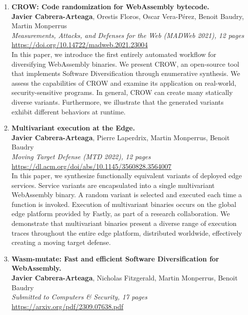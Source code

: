 \begin{enumerate}[label={\textbf{\Roman*}:}, ref={\Roman*}]
	\item \label{crowpaper} \textbf{CROW: Code randomization for WebAssembly bytecode.} \\ 
	\textbf{Javier Cabrera-Arteaga}, Orestis Floros, Oscar Vera-Pérez, Benoit Baudry, Martin Monperrus\\
	\textit{ Measurements, Attacks, and Defenses for the Web (MADWeb 2021), 12 pages} \\
	\url{https://doi.org/10.14722/madweb.2021.23004} \\
	
	 In this paper, we introduce the first entirely automated workflow for diversifying WebAssembly binaries. 
	We present CROW, an open-source tool that implements Software Diversification through enumerative synthesis. 
	We assess the capabilities of CROW and examine its application on real-world, security-sensitive programs.
	In general, CROW can create many statically diverse variants. 
	Furthermore, we illustrate that the generated variants exhibit different behaviors at runtime.

	
	
	\item \label{mewepaper} \textbf{Multivariant execution at the Edge. } \\
	\textbf{Javier Cabrera-Arteaga}, Pierre Laperdrix, Martin Monperrus, Benoit Baudry\\
    \textit{Moving Target Defense (MTD 2022), 12 pages} \\
    \url{https://dl.acm.org/doi/abs/10.1145/3560828.3564007} \\

	In this paper, we synthesize functionally equivalent variants of deployed edge services. 
	Service variants are encapsulated into a single multivariant WebAssembly binary. 
	A random variant is selected and executed each time a function is invoked.
	Execution of multivariant binaries occurs on the global edge platform provided by Fastly, as part of a research collaboration. 
	We demonstrate that multivariant binaries present a diverse range of execution traces throughout the entire edge platform, distributed worldwide, effectively creating a moving target defense.

	
	\item \label{wasmmutatepaper}\textbf{Wasm-mutate: Fast and efficient Software Diversification for WebAssembly. }\\ 
	\textbf{Javier Cabrera-Arteaga}, Nicholas Fitzgerald, Martin Monperrus, Benoit Baudry\\
	\textit{Submitted to Computers \& Security, 17 pages} \\
	\url{https://arxiv.org/pdf/2309.07638.pdf}


\end{enumerate}
